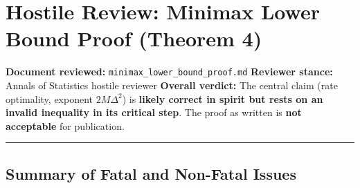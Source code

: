 \documentclass[
  12pt,
]{article}
\author{SCX}
\date{2026}
\begin{document}
\section{Hostile Review: Minimax Lower Bound Proof (Theorem
4)}\label{hostile-review-minimax-lower-bound-proof-theorem-4}

\textbf{Document reviewed:} \texttt{minimax\_lower\_bound\_proof.md}
\textbf{Reviewer stance:} Annals of Statistics hostile reviewer
\textbf{Overall verdict:} The central claim (rate optimality, exponent
\(2M\Delta^2\)) is \textbf{likely correct in spirit but rests on an
invalid inequality in its critical step}. The proof as written is
\textbf{not acceptable} for publication.

\begin{center}\rule{0.5\linewidth}{0.5pt}\end{center}

\subsection{Summary of Fatal and Non-Fatal
Issues}\label{summary-of-fatal-and-non-fatal-issues}
\end{document}
